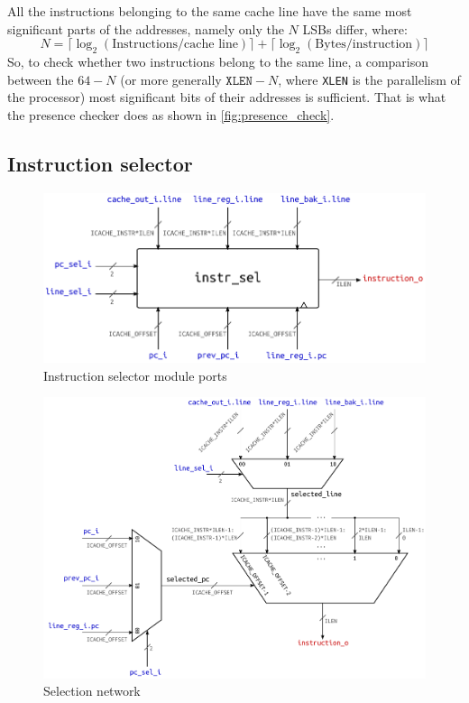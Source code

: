 All the instructions belonging to the same cache line have the same most significant parts of the addresses, namely only the $N$ \acsp{LSB} differ, where:
\begin{equation*}
  N = \lceil \log_2(\text{Instructions/cache line}) \rceil + 
      \lceil \log_2(\text{Bytes/instruction}) \rceil
\end{equation*}
So, to check whether two instructions belong to the same line, a comparison between the $64-N$ (or more generally $\texttt{XLEN}-N$, where \texttt{XLEN} is the parallelism of the processor) most significant bits of their addresses is sufficient. That is what the presence checker does as shown in \cref{fig:presence_check}.

\subsection{Instruction selector}
\begin{figure}[hbt]
  \centering
  \includegraphics{img/instr_sel-top.pdf}
  \caption{Instruction selector module ports}
  \label{fig:instr_sel-top}
\end{figure}
\begin{figure}[hbt]
  \includegraphics[width=\textwidth]{img/instr_sel.pdf}
  \caption{Selection network}
  \label{fig:instr_sel}
\end{figure}
